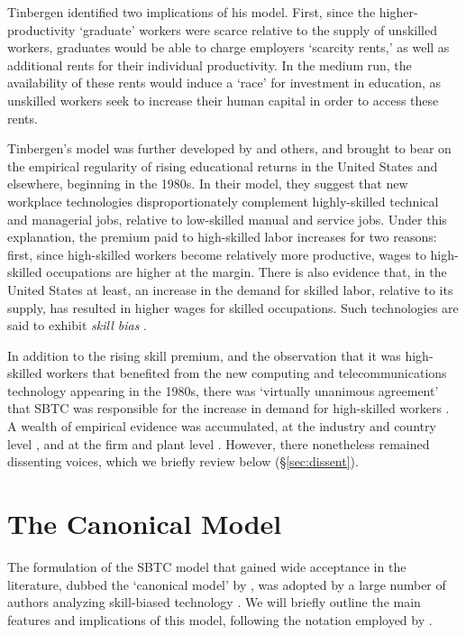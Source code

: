 Tinbergen identified two implications of his model. First, since the higher-productivity `graduate' workers were scarce relative to the supply of unskilled workers, graduates would be able to charge employers `scarcity rents,' as well as additional rents for their individual productivity. In the medium run, the availability of these rents would induce a `race' for investment in education, as unskilled workers seek to increase their human capital in order to access these rents.

Tinbergen's model was further developed by \citet{Katz1992} and others, and brought to bear on the empirical regularity of rising educational returns in the United States and elsewhere, beginning in the 1980s. In their model, they suggest that new workplace technologies disproportionately complement highly-skilled technical and managerial jobs, relative to low-skilled manual and service jobs. Under this explanation, the premium paid to high-skilled labor increases for two reasons: first, since high-skilled workers become relatively more productive, wages to high-skilled occupations are higher at the margin. There is also evidence that, in the United States at least, an increase in the demand for skilled labor, relative to its supply, has resulted in higher wages for skilled occupations. Such technologies are said to exhibit \emph{skill bias} \citep{Autor2006}.

In addition to the rising skill premium, and the observation that it was high-skilled workers that benefited from the new computing and telecommunications technology appearing in the 1980s, there was `virtually unanimous agreement' that SBTC was responsible for the increase in demand for high-skilled workers \citep[p.41]{Johnson1997}. A wealth of empirical evidence was accumulated, at the industry and country level \citep{Berman1994,Autor1998,Berman1998}, and at the firm and plant level \citep{Levy1996,Bresnahan2002}. However, there nonetheless remained dissenting voices, which we briefly review below (\S\ref{sec:dissent}).

\section{The Canonical Model}\label{sec:canonical}

The formulation of the SBTC model that gained wide acceptance in the literature, dubbed the `canonical model' by \citet{Acemoglu2011}, was adopted by a large number of authors analyzing skill-biased technology \citep[e.g.][]{Katz1992,Katz1999,Goldin2007,Acemoglu2011}.
We will briefly outline the main features and implications of this model, following the notation employed by \citet{Acemoglu2011}.

